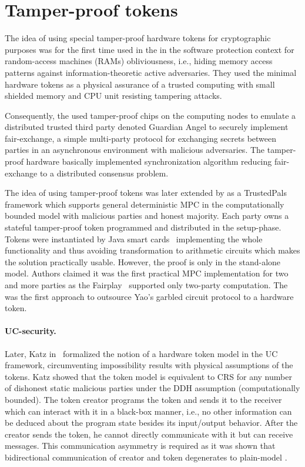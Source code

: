 \documentclass[
  digital, %
  twoside, %
  table,   %
  lof,     %
  lot,     %
]{fithesis3}
\theoremstyle{definition}
\theoremstyle{remark}
\begin{document}
\section{Tamper-proof tokens}\label{sec:soa:tokens}
The idea of using special tamper-proof hardware tokens for cryptographic purposes was for the first time used in the \cite{GO96} in the software protection context for random-access machines (RAMs) obliviousness, i.e., hiding memory access patterns against information-theoretic active adversaries. They used the minimal hardware tokens as a physical assurance of a trusted computing with small shielded memory and CPU unit resisting tampering attacks.

Consequently, the \cite{AV04} used tamper-proof chips on the computing nodes to emulate a distributed trusted third party denoted Guardian Angel to securely implement fair-exchange, a simple multi-party protocol for exchanging secrets between parties in an asynchronous environment with malicious adversaries. The tamper-proof hardware basically implemented synchronization algorithm reducing fair-exchange to a distributed consensus problem. 

The idea of using tamper-proof tokens was later extended by \cite{FFPBK06} as a TrustedPals framework which supports general deterministic MPC in the computationally bounded model with malicious parties and honest majority. Each party owns a stateful tamper-proof token programmed and distributed in the setup-phase. Tokens were instantiated by Java smart cards~\cite{DW99} implementing the whole functionality and thus avoiding transformation to arithmetic circuits which makes the solution practically usable. However, the proof is only in the stand-alone model. Authors claimed it was the first practical MPC implementation for two and more parties as the Fairplay~\cite{MNPS04} supported only two-party computation.
The \cite{JKSS10} was the first approach to outsource Yao's garbled circuit protocol to a hardware token.

\paragraph{UC-security.} %
Later, Katz in~\cite{K07} formalized the notion of a hardware token model in the UC framework, circumventing impossibility results with physical assumptions of the tokens. Katz showed that the token model is equivalent to CRS for any number of dishonest static malicious parties under the DDH assumption (computationally bounded). %
The token creator programs the token and sends it to the receiver which can interact with it in a black-box manner, i.e., no other information can be deduced about the program state besides its input/output behavior. %
After the creator sends the token, he cannot directly communicate with it but can receive messages. This communication asymmetry is required as it was shown that bidirectional communication of creator and token degenerates to plain-model \cite{CGS08}.
\end{document}
